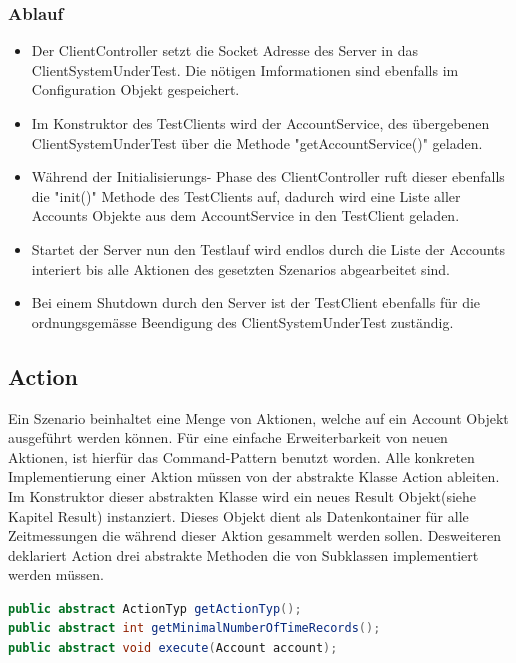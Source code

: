 \subsubsection{Ablauf}
\label{sec:ablauf}
\begin{itemize}
\item Der ClientController setzt die Socket Adresse des Server in das Client\-System\-Under\-Test. Die nötigen Imformationen sind ebenfalls im Configuration Objekt gespeichert.
\item Im Konstruktor des TestClients wird der AccountService, des über\-gebenen ClientSystemUnderTest über die Meth\-ode "getAccountService()" geladen. 
\item Während der Initialisierungs- Phase des ClientController ruft dieser ebenfalls die "init()" Methode des TestClients auf, dadurch wird eine Liste aller Accounts Objekte aus dem AccountService in den TestClient geladen.
\item Startet der Server nun den Testlauf wird endlos durch die Liste der Accounts interiert bis alle Aktionen des gesetzten Szenarios abgearbeitet sind.
\item Bei einem Shutdown durch den Server ist der TestClient ebenfalls für die ord\-nungs\-ge\-mä\-sse Be\-en\-di\-gung des ClientSystemUnderTest zu\-stän\-dig.
\end{itemize}

\subsection{Action}
\label{sec:action}
Ein Szenario beinhaltet eine Menge von Aktionen, welche auf ein Account Objekt ausgeführt werden können. Für eine einfache Erweiterbarkeit von neuen Aktionen, ist hierfür das Command-Pattern benutzt worden. Alle konkreten Implementierung einer Aktion müssen von der abstrakte Klasse Action ableiten. Im Konstruktor dieser abstrakten Klasse wird ein neues Result Objekt(siehe Kapitel Result) instanziert. Dieses Objekt dient als Datenkontainer für alle Zeitmessungen die während dieser Aktion gesammelt werden sollen. Desweiteren deklariert Action drei abstrakte Methoden die von Subklassen implementiert werden müssen.
\begin{lstlisting}[language=java, breaklines=true] 	
public abstract ActionTyp getActionTyp();
public abstract int getMinimalNumberOfTimeRecords();
public abstract void execute(Account account);	
\end{lstlisting}

